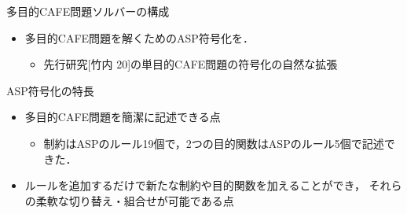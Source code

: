 \documentclass[dvipdfmx, 11pt]{beamer}
\begin{document}
\begin{frame}{多目的CAFE問題ソルバーの構成}
 \scalebox{0.9}{\centering}
 \begin{itemize}
  \item 多目的CAFE問題を解くためのASP符号化を．
	\begin{itemize}
	 \item 先行研究[竹内 20]の単目的CAFE問題の符号化の自然な拡張
	\end{itemize}
 \end{itemize}
 \begin{alertblock}{ASP符号化の特長}
  \begin{itemize}
   \item 多目的CAFE問題を簡潔に記述できる点
	 \begin{itemize}
	  \item 制約はASPのルール19個で，2つの目的関数はASPのルール5個で記述できた．
	 \end{itemize}
   \item ルールを追加するだけで新たな制約や目的関数を加えることができ，
	 それらの柔軟な切り替え・組合せが可能である点
  \end{itemize}
 \end{alertblock}
\end{frame}
\end{document}
